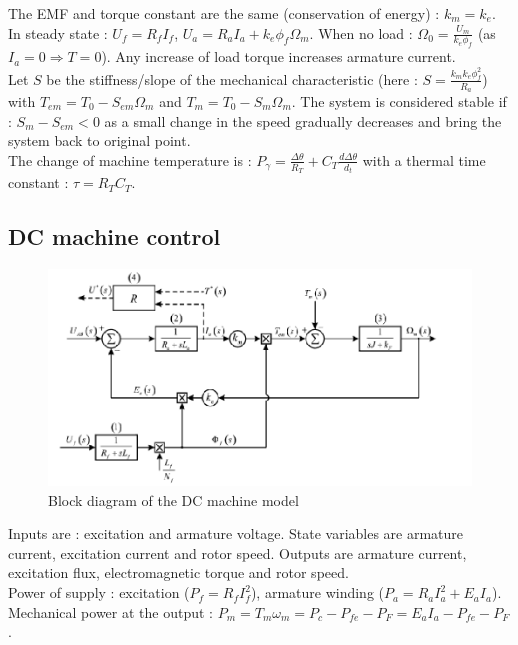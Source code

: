 \documentclass[../main.tex]{subfiles}
\begin{document}
\warning The EMF and torque constant are the same (conservation of energy) : $k_m=k_e$.\\

In steady state : $U_f = R_f I_f$, $U_a = R_aI_a + k_e \phi_f \Omega_m$. When no load : $\Omega_0 = \frac{U_m}{k_e \phi_f}$ (as $I_a = 0\Rightarrow T=0$). Any increase of load torque increases armature current. \\

\warning Let $S$ be the stiffness/slope of the mechanical characteristic (here : $S = \frac{k_mk_e\phi_f^2}{R_a}$) with $T_{em} = T_0 - S_{em}\Omega_m$ and $T_m = T_0-S_m \Omega_m$. The system is considered stable if : $S_m-S_{em} <0$ as a small change in the speed gradually decreases and bring the system back to original point.\\
The change of machine temperature is : $P_\gamma = \frac{\Delta \theta}{R_T} + C_T \frac{d\Delta \theta}{d_t}$ with a thermal time constant : $\tau = R_T C_T$.\\


\subsection{DC machine control}

\begin{figure}
    \centering
    \includegraphics[width=0.5\linewidth]{IMAGES/Indus_el/Screenshot from 2025-03-03 16-47-33.png}
    \caption{Block diagram of the DC machine model}
\end{figure}

Inputs are : excitation and armature voltage. State variables are armature current, excitation current and rotor speed. Outputs are armature current, excitation flux, electromagnetic torque and rotor speed.\\
Power of supply : excitation ($P_f = R_fI_f^2$), armature winding ($P_a = R_aI_a^2 + E_aI_a$). Mechanical power at the output : $P_m = T_m\omega_m = P_c-P_{fe}-P_F = E_aI_a - P_{fe}-P_F$.\\
\end{document}
